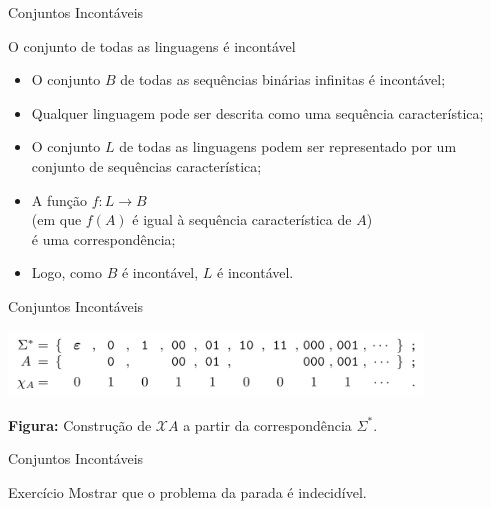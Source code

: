 \documentclass[xcolor=dvipsnames,table]{beamer}
\begin{document}
	\begin{frame}{Conjuntos Incontáveis}
		\begin{block}{O conjunto de todas as linguagens é incontável}
			\begin{itemize}
				\item O conjunto $B$ de todas as sequências binárias infinitas é incontável;
				\item Qualquer linguagem pode ser descrita como uma sequência característica;
				\item O conjunto $L$ de todas as linguagens podem ser representado por um conjunto de sequências característica;
				\item A função $f : L \rightarrow B$ \\(em que $f(A)$ é igual à sequência característica de $A$) \\é uma correspondência;
				\item Logo, como $B$ é incontável, $L$ é incontável.
			\end{itemize}
		\end{block}
	\end{frame}
	
	\begin{frame}{Conjuntos Incontáveis}
		\begin{center}
    		\includegraphics[width=11cm]{images/seqCar.png}
    		
    		{\bf Figura:} Construção de $\mathcal{X}A$ a partir da correspondência $\Sigma^*$.
  		\end{center}
	\end{frame}
	
	\begin{frame}{Conjuntos Incontáveis}
		\begin{block}{Exercício}
			Mostrar que o problema da parada é indecidível.
		\end{block}
	\end{frame}
	
\end{document}
